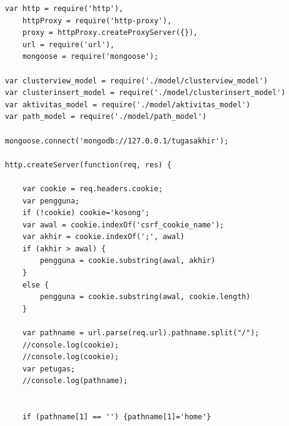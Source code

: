 \documentclass{ta-its}
\begin{document}
				\begin{lstlisting}[frame=single,tabsize=2,breaklines,caption={Implementasi Algoritma Berbasis Konten pada Balancer},label=implemenBalancer]
var http = require('http'),
	httpProxy = require('http-proxy'),
	proxy = httpProxy.createProxyServer({}),
	url = require('url'),
	mongoose = require('mongoose');

var clusterview_model = require('./model/clusterview_model')
var clusterinsert_model = require('./model/clusterinsert_model')
var aktivitas_model = require('./model/aktivitas_model')
var path_model = require('./model/path_model')

mongoose.connect('mongodb://127.0.0.1/tugasakhir');

http.createServer(function(req, res) {

	var cookie = req.headers.cookie;
	var pengguna;
	if (!cookie) cookie='kosong';
	var awal = cookie.indexOf('csrf_cookie_name');
	var akhir = cookie.indexOf(';', awal)
	if (akhir > awal) {
		pengguna = cookie.substring(awal, akhir)
	}
	else {
		pengguna = cookie.substring(awal, cookie.length)
	}
	
	var pathname = url.parse(req.url).pathname.split("/");
	//console.log(cookie);
	//console.log(cookie);
	var petugas;
	//console.log(pathname);
	
	
	if (pathname[1] == '') {pathname[1]='home'}
	

\end{lstlisting}
\end{document}
